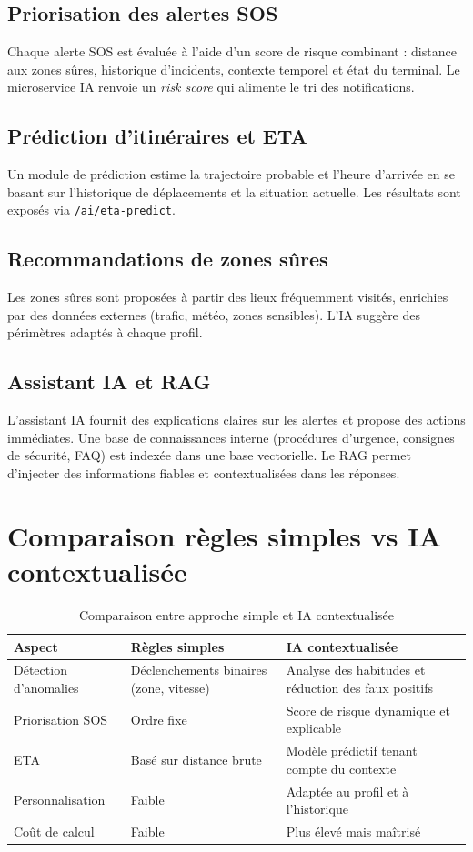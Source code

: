\subsection{Priorisation des alertes SOS}
Chaque alerte SOS est évaluée à l'aide d'un score de risque combinant : distance aux zones sûres, historique d'incidents, contexte temporel et état du terminal. Le microservice IA renvoie un \textit{risk score} qui alimente le tri des notifications.

\subsection{Prédiction d'itinéraires et ETA}
Un module de prédiction estime la trajectoire probable et l'heure d'arrivée en se basant sur l'historique de déplacements et la situation actuelle. Les résultats sont exposés via \texttt{/ai/eta-predict}.

\subsection{Recommandations de zones sûres}
Les zones sûres sont proposées à partir des lieux fréquemment visités, enrichies par des données externes (trafic, météo, zones sensibles). L'IA suggère des périmètres adaptés à chaque profil.

\subsection{Assistant IA et RAG}
L'assistant IA fournit des explications claires sur les alertes et propose des actions immédiates. Une base de connaissances interne (procédures d'urgence, consignes de sécurité, FAQ) est indexée dans une base vectorielle. Le RAG permet d'injecter des informations fiables et contextualisées dans les réponses.

\section{Comparaison règles simples vs IA contextualisée}
\begin{table}[H]
\centering
\begin{tabular}{|p{4cm}|p{5cm}|p{5cm}|}
\hline
\textbf{Aspect} & \textbf{Règles simples} & \textbf{IA contextualisée} \\ \hline
Détection d'anomalies & Déclenchements binaires (zone, vitesse) & Analyse des habitudes et réduction des faux positifs \\ \hline
Priorisation SOS & Ordre fixe & Score de risque dynamique et explicable \\ \hline
ETA & Basé sur distance brute & Modèle prédictif tenant compte du contexte \\ \hline
Personnalisation & Faible & Adaptée au profil et à l'historique \\ \hline
Coût de calcul & Faible & Plus élevé mais maîtrisé \\ \hline
\end{tabular}
\caption{Comparaison entre approche simple et IA contextualisée}
\end{table}

